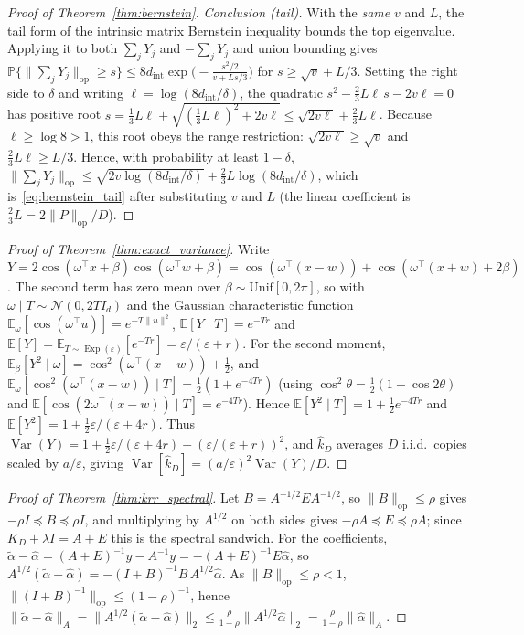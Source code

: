 \documentclass{article}
\DeclareMathOperator{\Var}{Var}
\DeclareMathOperator{\Exp}{Exp}
\begin{document}
\begin{proof}[Proof of Theorem~\ref{thm:bernstein}]
\emph{Conclusion (tail).} With the \emph{same} $v$ and $L$, the tail form of the intrinsic matrix Bernstein inequality \citep[Thm.~7.3.1]{tropp2015matrix} bounds the top eigenvalue. Applying it to both $\sum_jY_j$ and $-\sum_jY_j$ and union bounding gives $\mathbb{P}\{\|\sum_jY_j\|_{\mathrm{op}}\ge s\}\le 8d_{\mathrm{int}}\exp\!\bigl(-\tfrac{s^2/2}{v+Ls/3}\bigr)$ for $s\ge\sqrt v+L/3$. Setting the right side to $\delta$ and writing $\ell=\log(8d_{\mathrm{int}}/\delta)$, the quadratic $s^2-\tfrac23 L\ell\,s-2v\ell=0$ has positive root $s=\tfrac13 L\ell+\sqrt{(\tfrac13 L\ell)^2+2v\ell}\le\sqrt{2v\ell}+\tfrac23 L\ell$. Because $\ell\ge\log 8>1$, this root obeys the range restriction: $\sqrt{2v\ell}\ge\sqrt v$ and $\tfrac23L\ell\ge L/3$. Hence, with probability at least $1-\delta$, $\|\sum_jY_j\|_{\mathrm{op}}\le\sqrt{2v\log(8d_{\mathrm{int}}/\delta)}+\tfrac23 L\log(8d_{\mathrm{int}}/\delta)$, which is~\eqref{eq:bernstein_tail} after substituting $v$ and $L$ (the linear coefficient is $\tfrac23 L=2\|P\|_{\mathrm{op}}/D$).
\end{proof}

\begin{proof}[Proof of Theorem~\ref{thm:exact_variance}]
Write $Y=2\cos(\omega^\top x+\beta)\cos(\omega^\top w+\beta)=\cos(\omega^\top(x-w))+\cos(\omega^\top(x+w)+2\beta)$. The second term has zero mean over $\beta\sim\mathrm{Unif}[0,2\pi]$, so with $\omega\mid T\sim\mathcal{N}(0,2TI_d)$ and the Gaussian characteristic function $\mathbb{E}_\omega[\cos(\omega^\top u)]=e^{-T\|u\|^2}$, $\mathbb{E}[Y\mid T]=e^{-Tr}$ and $\mathbb{E}[Y]=\mathbb{E}_{T\sim\Exp(\varepsilon)}[e^{-Tr}]=\varepsilon/(\varepsilon+r)$. For the second moment, $\mathbb{E}_\beta[Y^2\mid\omega]=\cos^2(\omega^\top(x-w))+\tfrac12$, and $\mathbb{E}_\omega[\cos^2(\omega^\top(x-w))\mid T]=\tfrac12(1+e^{-4Tr})$ (using $\cos^2\theta=\tfrac12(1+\cos2\theta)$ and $\mathbb{E}[\cos(2\omega^\top(x-w))\mid T]=e^{-4Tr}$). Hence $\mathbb{E}[Y^2\mid T]=1+\tfrac12 e^{-4Tr}$ and $\mathbb{E}[Y^2]=1+\tfrac12\varepsilon/(\varepsilon+4r)$. Thus $\Var(Y)=1+\tfrac12\varepsilon/(\varepsilon+4r)-(\varepsilon/(\varepsilon+r))^2$, and $\widehat{k}_D$ averages $D$ i.i.d.\ copies scaled by $a/\varepsilon$, giving $\Var[\widehat{k}_D]=(a/\varepsilon)^2\Var(Y)/D$.
\end{proof}

\begin{proof}[Proof of Theorem~\ref{thm:krr_spectral}]
Let $B=A^{-1/2}EA^{-1/2}$, so $\|B\|_{\mathrm{op}}\le\rho$ gives $-\rho I\preceq B\preceq\rho I$, and multiplying by $A^{1/2}$ on both sides gives $-\rho A\preceq E\preceq\rho A$; since $K_D+\lambda I=A+E$ this is the spectral sandwich. For the coefficients, $\tilde\alpha-\hat\alpha=(A+E)^{-1}y-A^{-1}y=-(A+E)^{-1}E\hat\alpha$, so $A^{1/2}(\tilde\alpha-\hat\alpha)=-(I+B)^{-1}B\,A^{1/2}\hat\alpha$. As $\|B\|_{\mathrm{op}}\le\rho<1$, $\|(I+B)^{-1}\|_{\mathrm{op}}\le(1-\rho)^{-1}$, hence $\|\tilde\alpha-\hat\alpha\|_A=\|A^{1/2}(\tilde\alpha-\hat\alpha)\|_2\le\frac{\rho}{1-\rho}\|A^{1/2}\hat\alpha\|_2=\frac{\rho}{1-\rho}\|\hat\alpha\|_A$.
\end{proof}
\end{document}
